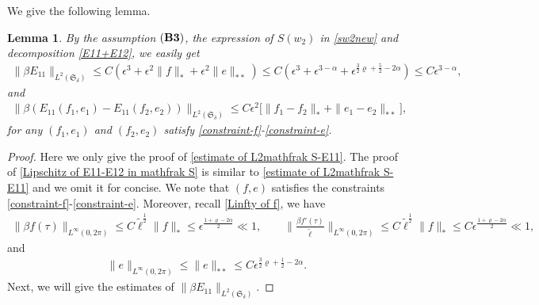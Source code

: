 \documentclass[10pt, reqno]{amsart}
\numberwithin{equation}{section}
\newtheorem{lemma}[theorem]{Lemma}
\theoremstyle{definition}
\begin{document}
{{We give the following lemma.
\begin{lemma}
By the assumption $\bf{(B3)}$, the expression of $S(w_2)$ in \eqref{sw2new} and decomposition \eqref{E11+E12}, we easily get
\begin{align} \label{estimate of L2mathfrak S-E11}
\|\beta E_{11}\|_{L^2(\mathfrak S_\delta)} \leq C\left( \epsilon^3+ \epsilon^2\|f\|_* + \epsilon^2\|e\|_{**}\right) \le C\left( \epsilon^3+ \epsilon^{3-\alpha} + \epsilon^{\frac 32 \varrho + \frac 52- 2\alpha}\right) \le C \epsilon^{3-\alpha},
\end{align}
and
\begin{align} \label{Lipschitz of E11-E12 in mathfrak S}
\big\|\beta\left(E_{11} (f_1, e_1) - E_{11} (f_2, e_2)\right)\big\|_{L^2(\mathfrak S_\delta)} \leq C \epsilon^2 \Big[\|f_1- f_2\|_*+ \|e_1- e_2\|_{**}  \Big],
\end{align}
for any $(f_1, e_1)$ and $(f_2, e_2)$ satisfy \eqref{constraint-f}-\eqref{constraint-e}.
\end{lemma}

\begin{proof}
Here we only give the proof of \eqref{estimate of L2mathfrak S-E11}.
The proof of \eqref{Lipschitz of E11-E12 in mathfrak S} is similar to \eqref{estimate of L2mathfrak S-E11} and we omit it for concise.
We note that $(f, e)$ satisfies the constraints \eqref{constraint-f}-\eqref{constraint-e}. Moreover, recall \eqref{Linfty of f}, we have
\begin{align} \label{f infty and f' infty}
\|\beta f(\tau)\|_{L^\infty(0, 2\pi)} \le C\tilde\ell^{\frac12} \|f\|_* \le \epsilon^{\frac{1+\varrho-2\alpha} 2} \ll 1,
\qquad
\Big\|\frac{\beta f'(\tau)}{\tilde \ell}\Big\|_{L^\infty(0, 2\pi)} \le C\tilde\ell^{\frac12} \|f\|_*\le C\epsilon^{\frac{1+\varrho-2\alpha} 2} \ll 1,
\end{align}
 and
\begin{align} \label{e Linfty}
 \|e\|_{L^\infty(0, 2\pi) } \le \|e\|_{**} \le C\epsilon^{\frac 32 \varrho + \frac 12- 2\alpha}.
\end{align}
Next, we will give the estimates of $\|\beta E_{11}\|_{L^2(\mathfrak S_\delta)} $.


\end{proof}}}
\end{document}
